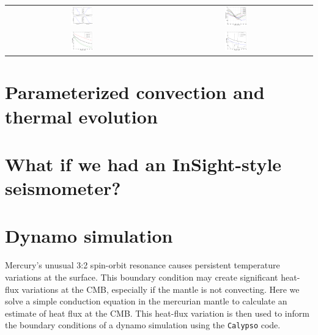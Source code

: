 \documentclass[landscape,a0b,final]{a0poster}
\begin{document}
\begin{multicols}{3}
\begin{center}
\begin{tabular}{cc}
 \includegraphics[width=0.15\textwidth]{profiles.png} &
 \includegraphics[width=0.15\textwidth]{Liquidus_model.png} \\
 \includegraphics[width=0.15\textwidth]{clapeyron_1.png} &
 \includegraphics[width=0.15\textwidth]{clapeyron_2.png} \\
\end{tabular}
\label{interior_model}
\end{center}

\columnbreak

\section*{Parameterized convection and thermal evolution}



\section*{What if we had an InSight-style seismometer?}


\columnbreak

\section*{Dynamo simulation}

Mercury's unusual 3:2 spin-orbit resonance causes persistent temperature variations at the surface.  This boundary condition may create significant heat-flux variations at the CMB, especially if the mantle is not convecting.  Here we solve a simple conduction equation in the mercurian mantle to calculate an estimate of heat flux at the CMB.  This heat-flux variation is then used to inform the boundary conditions of a dynamo simulation using the \texttt{Calypso} code.


\end{multicols}
\end{document}
